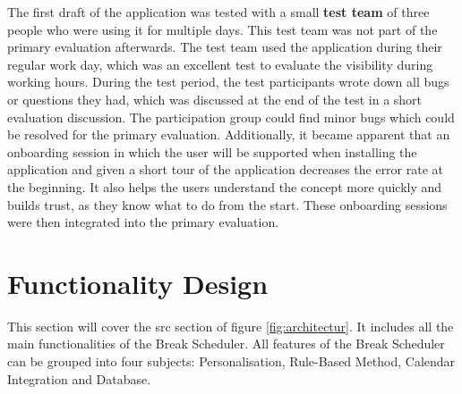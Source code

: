 \documentclass{hasel_thesis}
\begin{document}
The first draft of the application was tested with a small \textbf{test team} of three people who were using it for multiple days. This test team was not part of the primary evaluation afterwards. The test team used the application during their regular work day, which was an excellent test to evaluate the visibility during working hours. During the test period, the test participants wrote down all bugs or questions they had, which was discussed at the end of the test in a short evaluation discussion. The participation group could find minor bugs which could be resolved for the primary evaluation. Additionally, it became apparent that an onboarding session in which the user will be supported when installing the application and given a short tour of the application decreases the error rate at the beginning. It also helps the users understand the concept more quickly and builds trust, as they know what to do from the start. These onboarding sessions were then integrated into the primary evaluation.


\section{Functionality Design}

This section will cover the src section of figure \ref{fig:architectur}. It includes all the main functionalities of the Break Scheduler. All features of the Break Scheduler can be grouped into four subjects: Personalisation, Rule-Based Method, Calendar Integration and Database.
\end{document}
